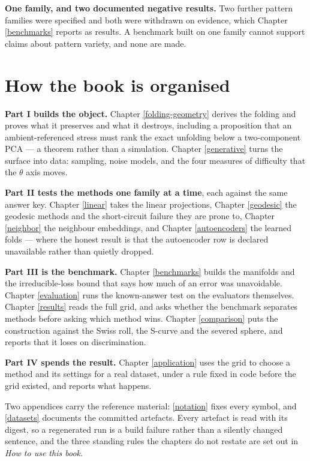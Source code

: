 \documentclass[
  british,
  a4paper,
]{book}
\newcounter{none} %
\begin{document}
\textbf{One family, and two documented negative results.} Two further pattern
families were specified and both were withdrawn on evidence, which Chapter
\ref{benchmarks} reports as results. A benchmark built on one family cannot
support claims about pattern variety, and none are made.

\section{How the book is organised}\label{intro-roadmap}

\textbf{Part I builds the object.} Chapter \ref{folding-geometry} derives the
folding and proves what it preserves and what it destroys, including a
proposition that an ambient-referenced stress must rank the exact unfolding
below a two-component PCA --- a theorem rather than a simulation. Chapter
\ref{generative} turns the surface into data: sampling, noise models, and the
four measures of difficulty that the \(\theta\) axis moves.

\textbf{Part II tests the methods one family at a time}, each against the same
answer key. Chapter \ref{linear} takes the linear projections, Chapter
\ref{geodesic} the geodesic methods and the short-circuit failure they are
prone to, Chapter \ref{neighbor} the neighbour embeddings, and Chapter
\ref{autoencoders} the learned folds --- where the honest result is that the
autoencoder row is declared unavailable rather than quietly dropped.

\textbf{Part III is the benchmark.} Chapter \ref{benchmarks} builds the manifolds
and the irreducible-loss bound that says how much of an error was unavoidable.
Chapter \ref{evaluation} runs the known-answer test on the evaluators
themselves. Chapter \ref{results} reads the full grid, and asks whether the
benchmark separates methods before asking which method wins. Chapter
\ref{comparison} puts the construction against the Swiss roll, the S-curve and
the severed sphere, and reports that it loses on discrimination.

\textbf{Part IV spends the result.} Chapter \ref{application} uses the grid to
choose a method and its settings for a real dataset, under a rule fixed in code
before the grid existed, and reports what happens.

Two appendices carry the reference material: \ref{notation} fixes every symbol,
and \ref{datasets} documents the committed artefacts. Every artefact is read
with its digest, so a regenerated run is a build failure rather than a silently
changed sentence, and the three standing rules the chapters do not restate are
set out in \emph{How to use this book}.
\end{document}
